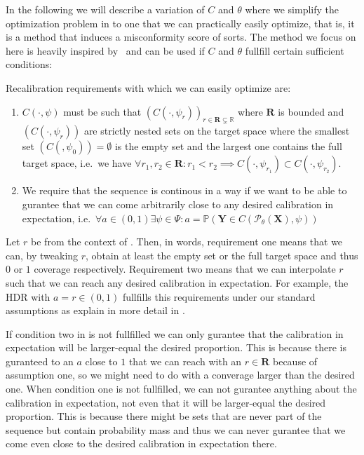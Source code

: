 In the following we will describe a variation of $C$ and $\theta$ where we simplify the optimization problem in  to one that we can practically easily optimize, that is, it is a method that induces a misconformity score of sorts. The method we focus on here is heavily inspired by~\cite{sesia2021conformal} and can be used if $C$ and $\theta$ fullfill certain sufficient conditions:

\begin{definition}\label{def:recalibration_requirements}

    Recalibration requirements with which we can easily optimize  are:
    \begin{enumerate}
        \item $C(\cdot,\psi)$ must be such that $\left(C\left(\cdot, \psi_r\right)\right)_{r \in \mathbf{R} \subsetneq \mathbb{R}}$ where $\mathbf{R}$ is bounded and $(C(\cdot,\psi_r))$ are strictly nested sets on the target space where the smallest set $(C(,\psi_0)) = \emptyset$ is the empty set and the largest one contains the full target space, i.e.\ we have $\forall r_1, r_2 \in \mathbf{R}: r_1 < r_2 \implies C(\cdot,\psi_{r_1}) \subset C(\cdot, \psi_{r_2})$.
        \item We require that the sequence is continous in a way if we want to be able to gurantee that we can come arbitrarily close to any desired calibration in expectation, i.e.\ $\forall a\in(0,1) \exists \psi\in\Psi : a = \mathbb{P}(\mathbf{Y} \in C(\mathscr{P}_{\theta}(\mathbf{X}), \psi))$
    \end{enumerate}
\end{definition}

Let $r$ be from the context of . Then, in words, requirement one means that we can, by tweaking $r$, obtain at least the empty set or the full target space and thus $0$ or $1$ coverage respectively. Requirement two means that we can interpolate $r$ such that we can reach any desired calibration in expectation. For example, the HDR with $a = r \in (0,1)$ fullfills this requirements under our standard assumptions  as explain in more detail in .

If condition two in  is not fullfilled we can only gurantee that the calibration in expectation will be larger-equal the desired proportion. This is because there is guranteed to an $a$ close to $1$ that we can reach with an $r \in \mathbf{R}$ because of assumption one, so we might need to do with a converage larger than the desired one. When condition one is not fullfilled, we can not gurantee anything about the calibration in expectation, not even that it will be larger-equal the desired proportion. This is because there might be sets that are never part of the sequence but contain probability mass and thus we can never gurantee that we come even close to the desired calibration in expectation there.

